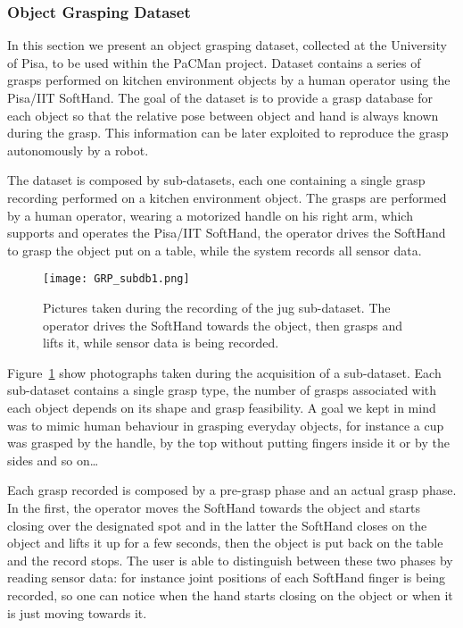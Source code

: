 
\subsubsection{Object Grasping Dataset}
\label{sec:ObjectGraspingDataset}

In this section we present an object grasping dataset, collected at the University of Pisa, to be used within the PaCMan project.
Dataset contains a series of grasps performed on kitchen environment objects by a human operator using the Pisa/IIT SoftHand.
The goal of the dataset is to provide a grasp database for each object so that the relative pose between object and hand is always known during the grasp. This information can be later 
exploited to reproduce the grasp autonomously by a robot. 

The dataset is composed by sub-datasets, each one containing a single grasp recording performed on a kitchen environment object. The grasps are performed by a human operator, wearing
a motorized handle on his right arm, which supports and operates the Pisa/IIT SoftHand, the operator drives the SoftHand to grasp the object put on a table, while the system records all sensor data. 
\begin{figure}[tb!]
  \centering
  \texttt{[image: GRP\_subdb1.png]}
  \caption{Pictures taken during the recording of the jug sub-dataset. The operator drives the SoftHand towards the object, then grasps and lifts it, while sensor data is being recorded.}
  \label{fig:grasp:subdb1}
\end{figure}
Figure~\ref{fig:grasp:subdb1} show photographs taken during the acquisition of a sub-dataset.
Each sub-dataset contains a single grasp type, the number of grasps associated with each object depends on its shape and grasp feasibility. A goal we kept in mind was to mimic human behaviour in grasping everyday objects,
for instance a cup was grasped by the handle, by the top without putting fingers inside it or by the sides and so on\ldots

Each grasp recorded is composed by a pre-grasp phase and an actual grasp phase. In the first, the operator moves the SoftHand towards the object and starts closing over the designated spot and in the latter the SoftHand 
closes on the object and lifts it up for a few seconds, then the object is put back on the table and the record stops. The user is able to distinguish between these two phases by reading sensor data: for instance joint positions
of each SoftHand finger is being recorded, so one can notice when the hand starts closing on the object or when it is just moving towards it.

